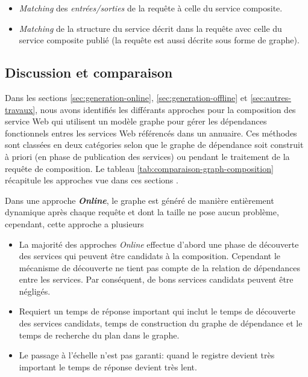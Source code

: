   \SpecialItem
  \begin{itemize}
  \item \textit{Matching} des \textit{entrées/sorties} de la requête à
    celle du service composite.

  \item \textit{Matching} de la structure du service décrit dans la
    requête avec celle du service composite publié (la requête est
    aussi décrite sous forme de graphe).
  \end{itemize}
  \enddescription

  \subsection{Discussion et comparaison}
  \label{sec:discussion-comparaison}
  Dans les sections \ref{sec:generation-online},
  \ref{sec:generation-offline} et \ref{sec:autres-travaux}, nous avons
  identifiés les différants approches pour la composition des service
  Web qui utilisent un modèle graphe pour gérer les dépendances
  fonctionnels entres les services Web référencés dans un
  annuaire. Ces méthodes sont classées en deux catégories selon que le
  graphe de dépendance soit construit à priori (en phase de
  publication des services) ou pendant le traitement de la requête de
  composition. Le tableau \ref{tab:comparaison-graph-composition}
  récapitule les approches vue dans ces sections . \bigskip

  Dans une approche \textbf{\textit{Online}}, le graphe est généré de
  manière entièrement dynamique après chaque requête et dont la taille
  ne pose aucun problème, cependant, cette approche a
  plusieurs

  \SpecialItem
  \begin{itemize}
  \item La majorité des approches \textit{Online} effectue d'abord une
    phase de découverte des services qui peuvent être candidats à la
    composition. Cependant le mécanisme de découverte ne tient pas
    compte de la relation de dépendances entre les services. Par
    conséquent, de bons services candidats peuvent être négligés.

  \item Requiert un temps de réponse important qui inclut le temps de
    découverte des services candidats, temps de construction du graphe
    de dépendance et le temps de recherche du plan dans le graphe.

  \item Le passage à l'échelle n'est pas garanti: quand le registre
    devient très important le temps de réponse devient très
    lent.\bigskip

  \end{itemize}
  \enddescription

